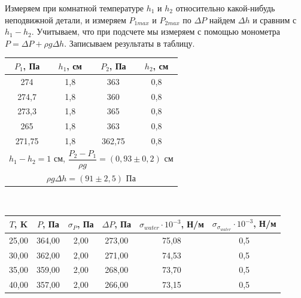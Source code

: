 \documentclass[a4paper, 12pt]{article}%
\begin{document}
Измеряем при комнатной температуре $h_1$ и $h_2$ относительно какой-нибудь неподвижной детали, и измеряем $P_{1max}$ и $P_{2max}$ по $\Delta P$ найдем $\Delta h$ и сравним с $h_1 - h_2$. Учитываем, что при подсчете мы измеряем с помощью монометра $P = \Delta P + \rho g \Delta h$. Записываем результаты в таблицу.
\begin{center}
\begin{tabular}{|c|c|c|c|}
\hline
$P_1$, Па             & $h_1$, см            & $P_2$, Па            & $h_2$, см            \\ \hline
274                   & 1,8                  & 363                  & 0,8                  \\ \hline
274,7                 & 1,8                  & 360                  & 0,8                  \\ \hline
273,3                 & 1,8                  & 365                  & 0,8                  \\ \hline
265                   & 1,8                  & 363                  & 0,8                  \\ \hline \hline
271,75                & 1,8                  & 362,75               & 0,8                  \\ \hline
\multicolumn{4}{|c|}{$h_1 - h_2 = 1$ см, $\dfrac{P_2 - P_1}{\rho g} = (0,93 \pm 0,2)$ см} \\ \hline
\multicolumn{4}{|c|}{$\rho g \Delta h = (91 \pm 2,5)$ Па}                                  \\ \hline
\end{tabular} \\
\begin{tabular}{|c|c|c|c|c|c|}
\hline
$T$, K & $P$, Па & $\sigma_P$, Па & $\Delta P$, Па & $\sigma_{water} \cdot 10^{-3}$, Н/м & $\sigma_{\sigma_{water}} \cdot 10^{-3}$, Н/м \\ \hline
25,00  & 364,00  & 2,00           & 273,00    & 75,08                               & 0,5                                        \\ \hline
30,00  & 362,00  & 2,00           & 271,00    & 74,53                               & 0,5                                        \\ \hline
35,00  & 359,00  & 2,00           & 268,00    & 73,70                               & 0,5                                        \\ \hline
40,00  & 357,00  & 2,00           & 266,00    & 73,15                               & 0,5                                        \\ \hline

\end{tabular}
\end{center}
\end{document}
